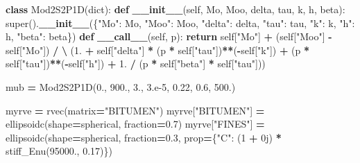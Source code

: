 \documentclass[
  a4paper,
  numbers=noendperiod,
  DIV=12]{scrreprt}
\newenvironment{Shaded}{\begin{snugshade}}{\end{snugshade}}
\newcommand{\BuiltInTok}[1]{#1}
\newcommand{\ControlFlowTok}[1]{\textcolor[rgb]{0.13,0.29,0.53}{\textbf{#1}}}
\newcommand{\DecValTok}[1]{\textcolor[rgb]{0.00,0.00,0.81}{#1}}
\newcommand{\FloatTok}[1]{\textcolor[rgb]{0.00,0.00,0.81}{#1}}
\newcommand{\FunctionTok}[1]{\textcolor[rgb]{0.13,0.29,0.53}{\textbf{#1}}}
\newcommand{\KeywordTok}[1]{\textcolor[rgb]{0.13,0.29,0.53}{\textbf{#1}}}
\newcommand{\NormalTok}[1]{#1}
\newcommand{\OperatorTok}[1]{\textcolor[rgb]{0.81,0.36,0.00}{\textbf{#1}}}
\newcommand{\OtherTok}[1]{\textcolor[rgb]{0.56,0.35,0.01}{#1}}
\newcommand{\StringTok}[1]{\textcolor[rgb]{0.31,0.60,0.02}{#1}}
\newcommand{\VariableTok}[1]{\textcolor[rgb]{0.00,0.00,0.00}{#1}}
\begin{document}
\begin{Shaded}
\begin{Highlighting}[]
\KeywordTok{class}\NormalTok{ Mod2S2P1D(}\BuiltInTok{dict}\NormalTok{):}
    \KeywordTok{def} \FunctionTok{\_\_init\_\_}\NormalTok{(}\VariableTok{self}\NormalTok{, Mo, Moo, delta, tau, k, h, beta):}
        \BuiltInTok{super}\NormalTok{().}\FunctionTok{\_\_init\_\_}\NormalTok{(\{}\StringTok{"Mo"}\NormalTok{: Mo, }\StringTok{"Moo"}\NormalTok{: Moo, }\StringTok{"delta"}\NormalTok{: delta,}
                         \StringTok{"tau"}\NormalTok{: tau, }\StringTok{"k"}\NormalTok{: k, }\StringTok{"h"}\NormalTok{: h, }\StringTok{"beta"}\NormalTok{: beta\})}
    \KeywordTok{def} \FunctionTok{\_\_call\_\_}\NormalTok{(}\VariableTok{self}\NormalTok{, p):}
        \ControlFlowTok{return} \VariableTok{self}\NormalTok{[}\StringTok{"Mo"}\NormalTok{] }\OperatorTok{+}\NormalTok{ (}\VariableTok{self}\NormalTok{[}\StringTok{"Moo"}\NormalTok{] }\OperatorTok{{-}} \VariableTok{self}\NormalTok{[}\StringTok{"Mo"}\NormalTok{]) }\OperatorTok{/} \OperatorTok{\textbackslash{}}
\NormalTok{            (}\FloatTok{1.} \OperatorTok{+} \VariableTok{self}\NormalTok{[}\StringTok{"delta"}\NormalTok{] }\OperatorTok{*}\NormalTok{ (p }\OperatorTok{*} \VariableTok{self}\NormalTok{[}\StringTok{"tau"}\NormalTok{])}\OperatorTok{**}\NormalTok{(}\OperatorTok{{-}}\VariableTok{self}\NormalTok{[}\StringTok{"k"}\NormalTok{])}
             \OperatorTok{+}\NormalTok{ (p }\OperatorTok{*} \VariableTok{self}\NormalTok{[}\StringTok{"tau"}\NormalTok{])}\OperatorTok{**}\NormalTok{(}\OperatorTok{{-}}\VariableTok{self}\NormalTok{[}\StringTok{"h"}\NormalTok{])}
             \OperatorTok{+} \FloatTok{1.} \OperatorTok{/}\NormalTok{ (p }\OperatorTok{*} \VariableTok{self}\NormalTok{[}\StringTok{"beta"}\NormalTok{] }\OperatorTok{*} \VariableTok{self}\NormalTok{[}\StringTok{"tau"}\NormalTok{]))}

\NormalTok{mub }\OperatorTok{=}\NormalTok{ Mod2S2P1D(}\FloatTok{0.}\NormalTok{, }\FloatTok{900.}\NormalTok{, }\FloatTok{3.}\NormalTok{, }\FloatTok{3.e{-}5}\NormalTok{, }\FloatTok{0.22}\NormalTok{, }\FloatTok{0.6}\NormalTok{, }\FloatTok{500.}\NormalTok{)}

\NormalTok{myrve }\OperatorTok{=}\NormalTok{ rvec(matrix}\OperatorTok{=}\StringTok{"BITUMEN"}\NormalTok{)}
\NormalTok{myrve[}\StringTok{"BITUMEN"}\NormalTok{] }\OperatorTok{=}\NormalTok{ ellipsoidc(shape}\OperatorTok{=}\NormalTok{spherical, fraction}\OperatorTok{=}\FloatTok{0.7}\NormalTok{)}
\NormalTok{myrve[}\StringTok{"FINES"}\NormalTok{] }\OperatorTok{=}\NormalTok{ ellipsoidc(shape}\OperatorTok{=}\NormalTok{spherical, fraction}\OperatorTok{=}\FloatTok{0.3}\NormalTok{,}
\NormalTok{    prop}\OperatorTok{=}\NormalTok{\{}\StringTok{"C"}\NormalTok{: (}\DecValTok{1} \OperatorTok{+} \OtherTok{0j}\NormalTok{) }\OperatorTok{*}\NormalTok{ stiff\_Enu(}\FloatTok{95000.}\NormalTok{, }\FloatTok{0.17}\NormalTok{)\})}


\end{Highlighting}
\end{Shaded}
\end{document}
